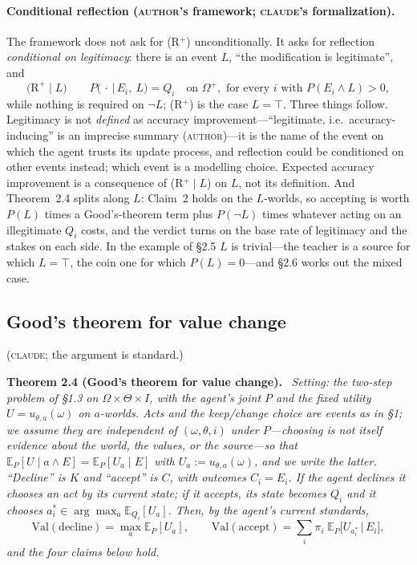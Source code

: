 \documentclass[11pt,a4paper]{article}
\newcommand{\E}{\mathbb{E}}
\newcommand{\Val}{\mathrm{Val}}
\newcommand{\accept}{\text{accept}}
\newcommand{\decline}{\text{decline}}
\newcommand{\AUTHOR}{\textnormal{\scshape author}}
\newcommand{\CLAUDE}{\textnormal{\scshape claude}}
\newenvironment{stmt}[2]{\par\medskip\noindent\textbf{#1 #2.}\ \itshape\ignorespaces}{\par\medskip}
\begin{document}
\paragraph{Conditional reflection (\AUTHOR's framework; \CLAUDE's formalization).}
The framework does not ask for (R$^+$) unconditionally. It asks for reflection \emph{conditional on legitimacy}: there is an event $L$, ``the modification is legitimate'', and
\[
\text{(R}^+\mid L)\qquad P\bigl(\,\cdot\,\big|\, E_i,\ L\bigr) = Q_i \quad\text{on } \Omega^+, \text{ for every } i \text{ with } P(E_i \wedge L) > 0,
\]
while nothing is required on $\neg L$; (R$^+$) is the case $L = \top$. Three things follow. Legitimacy is not \emph{defined} as accuracy improvement---``legitimate, i.e.\ accuracy-inducing'' is an imprecise summary (\AUTHOR)---it is the name of the event on which the agent trusts its update process, and reflection could be conditioned on other events instead; which event is a modelling choice. Expected accuracy improvement is a consequence of (R$^+\mid L$) on $L$, not its definition. And Theorem~2.4 splits along $L$: Claim~2 holds on the $L$-worlds, so accepting is worth $P(L)$ times a Good's-theorem term plus $P(\neg L)$ times whatever acting on an illegitimate $Q_i$ costs, and the verdict turns on the base rate of legitimacy and the stakes on each side. In the example of \S2.5 $L$ is trivial---the teacher is a source for which $L = \top$, the coin one for which $P(L) = 0$---and \S2.6 works out the mixed case.

\subsection{Good's theorem for value change}
(\CLAUDE; the argument is standard.)
\begin{stmt}{Theorem}{2.4 (Good's theorem for value change)}
Setting: the two-step problem of \S1.3 on $\Omega \times \Theta \times I$, with the agent's joint $P$ and the fixed utility $U = u_{\theta, a}(\omega)$ on $a$-worlds. Acts and the keep/change choice are events as in \S1; we assume they are independent of $(\omega, \theta, i)$ under $P$---choosing is not itself evidence about the world, the values, or the source---so that $\mathbb E_P[ U \mid a \wedge E] = \mathbb E_P[ U_a \mid E]$ with $U_a := u_{\theta, a}(\omega)$, and we write the latter. ``Decline'' is $K$ and ``accept'' is $C$, with outcomes $C_i = E_i$. If the agent declines it chooses an act by its current state; if it accepts, its state becomes $Q_i$ and it chooses $a^*_i \in \arg\max_a \mathbb E_{Q_i}[ U_a]$. Then, by the agent's current standards,
\[
\Val(\decline) = \max_a \E_P[U_a], \qquad \Val(\accept) = \sum_i \pi_i\; \E_P\bigl[U_{a^*_i} \,\big|\, E_i\bigr],
\]
and the four claims below hold.
\end{stmt}
\end{document}
